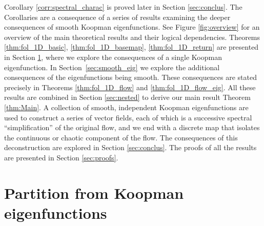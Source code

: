 \documentclass[12pt,oneside]{article}
\begin{document}
Corollary \ref{corr:spectral_charac} is proved later in Section \ref{sec:conclus}. 
The Corollaries are a consequence of a series of results examining the deeper consequences of smooth Koopman eigenfunctions. See Figure \ref{fig:overview} for an overview of the main theoretical results and their logical dependencies. Theorems \ref{thm:fol_1D_basic}, \ref{thm:fol_1D_basemap}, \ref{thm:fol_1D_return} are presented in Section \ref{sec:partition}, where we explore the consequences of a single Koopman eigenfunction. In Section~\ref{sec:smooth_eig} we explore the additional consequences of the eigenfunctions being smooth. These consequences are stated precisely in Theorems \ref{thm:fol_1D_flow} and \ref{thm:fol_1D_flow_eig}. All these results are combined in Section \ref{sec:nested} to derive our main result Theorem \ref{thm:Main}. A collection of smooth, independent Koopman eigenfunctions are used to construct a series of vector fields, each of which is a successive spectral ``simplification'' of the original flow, and we end with a discrete map that isolates the continuous or chaotic component of the flow. The consequences of this deconstruction are explored in Section \ref{sec:conclus}. The proofs of all the results are presented in Section \ref{sec:proofs}.  

\section{Partition from Koopman eigenfunctions} \label{sec:partition}
\end{document}
